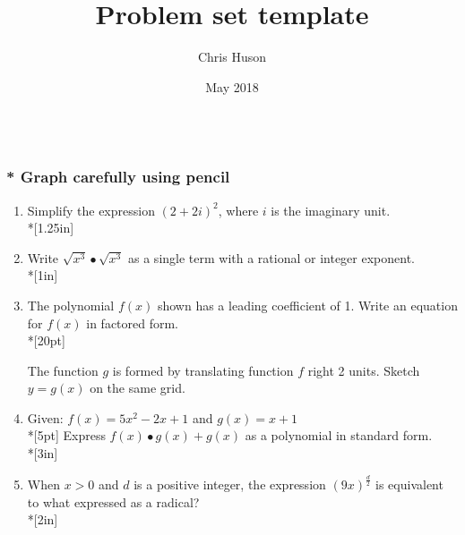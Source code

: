 \documentclass[12pt, oneside]{article}
\title{Problem set template}
\author{Chris Huson}
\date{May 2018}
\begin{document}

\subsubsection*{\\* \textnormal{Graph carefully using pencil}}

\begin{enumerate}


\item Simplify the expression $(2 + 2i)^2$, where $i$ is the imaginary unit. \\*[1.25in]

\item Write $\sqrt{x^3} \bullet \sqrt{x^3}$ as a single term with a rational or integer exponent.\\*[1in]

\item The polynomial $f(x)$ shown has a leading coefficient of 1. Write an equation for $f(x)$ in factored form.\\*[20pt]
\begin{center}
\end{center}
The function $g$ is formed by translating function $f$ right 2 units. Sketch $y=g(x)$ on the same grid.

\newpage

\item Given: $f(x)=5x^2 - 2x + 1$ and $g(x)=x+1$\\*[5pt]
Express $f(x) \bullet g(x) + g(x)$ as a polynomial in standard form. \\*[3in]


\item When $x>0$ and $d$ is a positive integer, the expression $\displaystyle \left(9x \right)^\frac{d}{2}$ is equivalent to what expressed as a radical? \\*[2in]


\end{enumerate}
\end{document}
